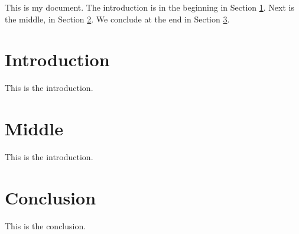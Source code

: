 \documentclass[11pt]{article}
\begin{document}
This is my document.
The introduction is in the beginning in Section \ref{sec:intro}.
Next is the middle, in Section \ref{sec:middle}.
We conclude at the end in Section \ref{sec:conc}.

\section{Introduction} \label{sec:intro}

This is the introduction.

\section{Middle} \label{sec:middle}

This is the introduction.

\section{Conclusion} \label{sec:conc}

This is the conclusion.
\end{document}
